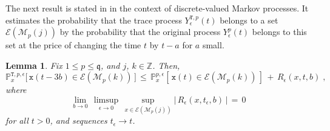 \documentclass[reqno]{amsart}
\theoremstyle{plain}
\newtheorem{lemma}[theorem]{Lemma}
\theoremstyle{definition}
\newcommand{\mf}[1]{{\mathfrak #1}}
\newcommand{\bb}[1]{{\mathbb #1}}
\newcommand{\ms}[1]{{\mathscr #1}}
\newcommand{\mtt}[1]{{\mathtt #1}}
\newcommand{\<}{\langle}
\renewcommand{\>}{\rangle}
\begin{document}
The next result is stated in \cite[Lemma 3.1]{llm} in the context of
discrete-valued Markov processes. It estimates the probability that
the trace process $Y^{{\mtt T}, p}_\epsilon (t)$ belongs to a set
$\ms E (\ms M_p(j))$ by the probability that the original process
$Y^{p}_\epsilon (t)$ belongs to this set at the price of changing the
time $t$ by $t-a$ for $a$ small.

\begin{lemma}
\label{l08}
Fix $1\le p\le\mf q$, and $j$, $k\in\bb Z$.  Then, 
\begin{equation*}
\bb P^{{\mtt T}, p, \epsilon}_{x}
\big[\, \mtt x (t-3b) \in \mathcal{E}(\ms M_p(k))\,\big] \, \le\,
\bb P^{p, \epsilon} _{x}
[ \, \mtt x  (t) \in  \ms E(\ms M_p(k)) \, ]
\,+ \, R_{\epsilon}(x,t,b)\;,
\end{equation*}
where 
\begin{equation*}
\lim_{b\rightarrow0}\,\limsup_{\epsilon\to0}\,
\sup_{x\in \ms E (\ms M_p(j))}
|\,R_{\epsilon}(x, t_\epsilon,b)\,| \,=\, 0
\end{equation*}
for all $t>0$, and sequences $t_\epsilon \to t$.
\end{lemma}
\end{document}
